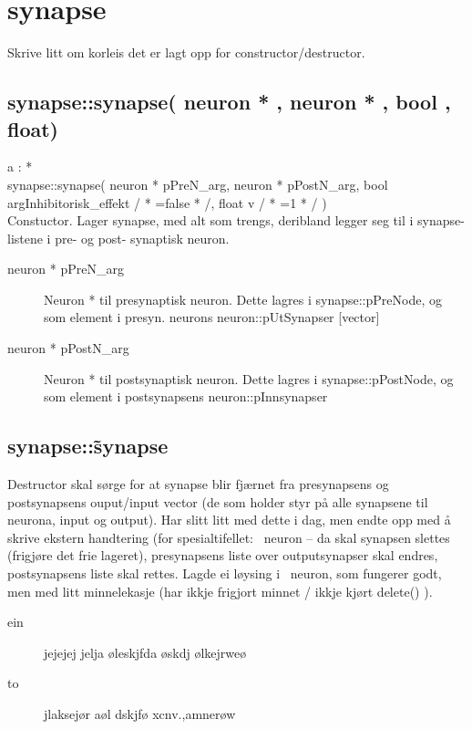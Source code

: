 
\chapter{synapse}

Skrive litt om korleis det er lagt opp for constructor/destructor.


\section{synapse::synapse( neuron * , neuron  * , bool , float)}
a :  * \\
synapse::synapse( neuron *  pPreN\_arg, neuron  *  pPostN\_arg, bool argInhibitorisk\_effekt / * =false * /, float v / * =1 * / )\\
Constuctor. Lager synapse, med alt som trengs, deribland legger seg til i synapse-listene i pre- og post- synaptisk neuron.
\begin{description}
	\item[neuron *  pPreN\_arg] Neuron *  til presynaptisk neuron. Dette lagres i synapse::pPreNode, og som element i presyn. neurons neuron::pUtSynapser [vector]
	\item[neuron *  pPostN\_arg] Neuron *  til postsynaptisk neuron. Dette lagres i synapse::pPostNode, og som element i postsynapsens neuron::pInnsynapser
\end{description}

\section{synapse::\~synapse}
Destructor skal sørge for at synapse blir fjærnet fra presynapsens og postsynapsens ouput/input vector (de som holder styr på alle synapsene til neurona, input og output). Har slitt litt med dette i dag, men endte opp med å skrive ekstern handtering (for spesialtifellet: ~neuron -- da skal synapsen slettes (frigjøre det frie lageret), presynapsens liste over outputsynapser skal endres, postsynapsens liste skal rettes. Lagde ei løysing i ~neuron, som fungerer godt, men med litt minnelekasje (har ikkje frigjort minnet / ikkje kjørt delete() ).


			\begin{description}
				\item[ein] jejejej jelja øleskjfda øskdj ølkejrweø 
				\item[to] jlaksejør aøl dskjfø xcnv.,amnerøw
 			\end{description}
